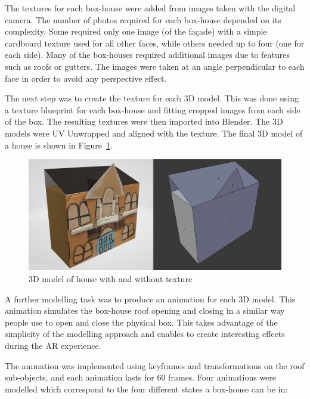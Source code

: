 \documentclass[acmlarge,screen,dvipsnames]{acmart}
\begin{document}
The textures for each box-house were added from images taken with the digital
camera. The number of photos required for each box-house depended on its complexity. Some required only one image (of the fa\c{c}ade) with a simple
 cardboard texture used for all other faces, while others needed up to four
 (one for each side). Many of the box-houses required additional images due to
 features such as roofs or gutters. The images were taken at an angle
 perpendicular to each face in order to avoid any perspective effect. 



The next step was to create the
texture for each 3D model. This was done using a texture blueprint for each box-house and fitting cropped images from each side of the box. The resulting
textures were then imported into Blender. The 3D models were UV Unwrapped and
aligned with the texture. The final 3D model of a house is shown in
Figure~\ref{fig:3Dhouse}. 

\begin{figure}[h] \centering
\includegraphics[width=\linewidth]{images/models.PNG} \caption{3D model
of house with and without texture} \label{fig:3Dhouse} 
\end{figure}

A further modelling task was to produce an animation for each 3D model. This
animation simulates the box-house roof opening and closing in a similar way people use to open and close the physical box. This takes advantage of the simplicity of the modelling approach and enables to create interesting effects during the AR experience.

The animation was implemented using
keyframes and transformations on the roof sub-objects, and each animation
lasts for 60 frames. Four animations were modelled which correspond to the
four different states a box-house can be in: 
\end{document}
